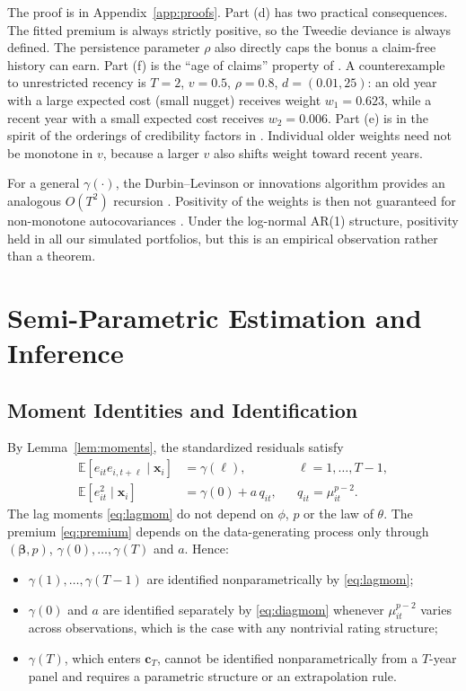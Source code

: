\documentclass[mathematics,article,submit,moreauthors]{Definitions/mdpi}
\newcommand{\E}{\mathbb{E}}
\newcommand{\bc}{\boldsymbol{c}}
\newcommand{\bx}{\boldsymbol{x}}
\newcommand{\bbeta}{\boldsymbol{\beta}}
\begin{document}
The proof is in Appendix~\ref{app:proofs}. Part (d) has two practical consequences. The fitted premium is always strictly positive, so the Tweedie deviance is always defined. The persistence parameter $\rho$ also directly caps the bonus a claim-free history can earn. Part (f) is the ``age of claims'' property of \citet{pinquet2001}. A counterexample to unrestricted recency is $T=2$, $v=0.5$, $\rho=0.8$, $d=(0.01,25)$: an old year with a large expected cost (small nugget) receives weight $w_1=0.623$, while a recent year with a small expected cost receives $w_2=0.006$. Part (e) is in the spirit of the orderings of credibility factors in \citet{ahn2021ordering}. Individual older weights need not be monotone in $v$, because a larger $v$ also shifts weight toward recent years.

For a general $\gamma(\cdot)$, the Durbin--Levinson or innovations algorithm provides an analogous $O(T^2)$ recursion \citep[Chapter~5]{brockwell1991}. Positivity of the weights is then not guaranteed for non-monotone autocovariances \citep[cf.][]{pinquet2020}. Under the log-normal AR(1) structure, positivity held in all our simulated portfolios, but this is an empirical observation rather than a theorem.

\section{Semi-Parametric Estimation and Inference}\label{sec:estimation}

\subsection{Moment Identities and Identification}

By Lemma~\ref{lem:moments}, the standardized residuals satisfy
\begin{align}
\E[e_{it}e_{i,t+\ell}\mid\bx_i]&=\gamma(\ell), && \ell=1,\dots,T-1, \label{eq:lagmom}\\
\E[e_{it}^2\mid\bx_i]&=\gamma(0)+a\,q_{it}, && q_{it}=\mu_{it}^{p-2}. \label{eq:diagmom}
\end{align}
The lag moments \eqref{eq:lagmom} do not depend on $\phi$, $p$ or the law of $\theta$. The premium \eqref{eq:premium} depends on the data-generating process only through $(\bbeta,p)$, $\gamma(0),\dots,\gamma(T)$ and $a$. Hence:
\begin{itemize}
\item $\gamma(1),\dots,\gamma(T-1)$ are identified nonparametrically by \eqref{eq:lagmom};
\item $\gamma(0)$ and $a$ are identified separately by \eqref{eq:diagmom} whenever $\mu_{it}^{p-2}$ varies across observations, which is the case with any nontrivial rating structure;
\item $\gamma(T)$, which enters $\bc_T$, cannot be identified nonparametrically from a $T$-year panel and requires a parametric structure or an extrapolation rule.
\end{itemize}
\end{document}
